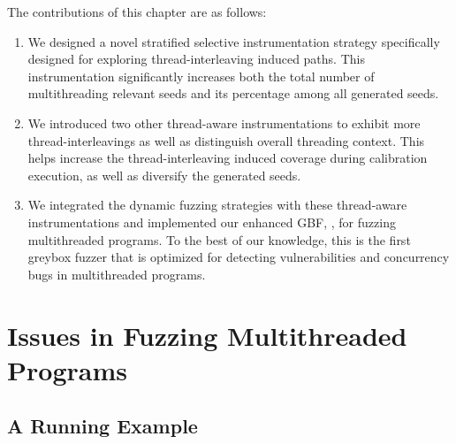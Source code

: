 The contributions of this chapter are as follows:
\begin{enumerate}[1)]
\item We designed a novel stratified selective instrumentation strategy specifically designed for exploring thread-interleaving induced paths. This instrumentation significantly increases both the total number of multithreading relevant seeds and its percentage among all generated seeds.
\item We introduced two other thread-aware instrumentations to exhibit more thread-interleavings as well as distinguish overall threading context. This helps increase the thread-interleaving induced coverage during calibration execution, as well as diversify the generated seeds.
\item We integrated the dynamic fuzzing strategies with these thread-aware instrumentations and implemented our enhanced GBF, \mtfuzz, for fuzzing multithreaded programs. To the best of our knowledge, this is the first greybox fuzzer that is optimized for detecting vulnerabilities and concurrency bugs in  multithreaded programs.
\end{enumerate}




\section{Issues in Fuzzing Multithreaded Programs}\label{sec:motivation}

\subsection{A Running Example}\label{sec:example}



